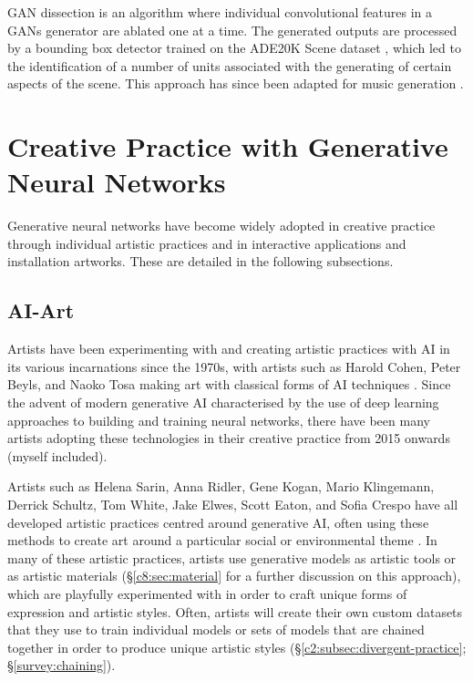 GAN dissection \citep{Bau2018-td} is an algorithm where individual convolutional features in a GANs generator are ablated one at a time.
The generated outputs are processed by a bounding box detector trained on the ADE20K Scene dataset \citep{zhou2017scene}, which led to the identification of a number of units associated with the generating of certain aspects of the scene. 
This approach has since been adapted for music generation \citep{Brink2019-gc}. 

\section{Creative Practice with Generative Neural Networks}

Generative neural networks have become widely adopted in creative practice through individual artistic practices and in interactive applications and installation artworks. 
These are detailed in the following subsections.

\subsection{AI-Art} 

Artists have been experimenting with and creating artistic practices with AI in its various incarnations since the 1970s, with artists such as Harold Cohen, Peter Beyls, and Naoko Tosa making art with classical forms of AI techniques \citep{grba2022deep}. 
Since the advent of modern generative AI characterised by the use of deep learning approaches to building and training neural networks, there have been many artists adopting these technologies in their creative practice from 2015 onwards (myself included). 

Artists such as Helena Sarin, Anna Ridler, Gene Kogan, Mario Klingemann, Derrick Schultz, Tom White, Jake Elwes, Scott Eaton, and Sofia Crespo have all developed artistic practices centred around generative AI, often using these methods to create art around a particular social or environmental theme \citep{grba2022deep}. 
In many of these artistic practices, artists use generative models as artistic tools or as artistic materials (\S \ref{c8:sec:material} for a further discussion on this approach), which are playfully experimented with in order to craft unique forms of expression and artistic styles.
Often, artists will create their own custom datasets that they use to train individual models or sets of models that are chained together in order to produce unique artistic styles (\S \ref{c2:subsec:divergent-practice}; \S \ref{survey:chaining}).

